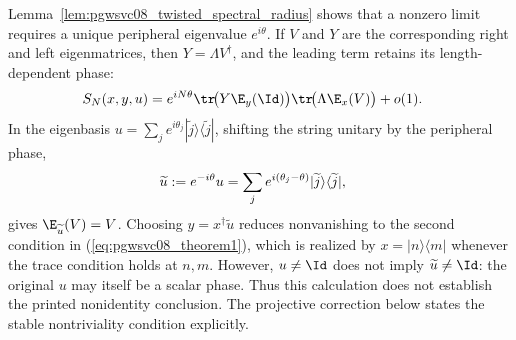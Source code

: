 \begin{remark}
    Lemma~\ref{lem:pgwsvc08_twisted_spectral_radius} shows that a nonzero
    limit requires a unique peripheral eigenvalue $e^{i\theta}$.  If $V$ and
    $Y$ are the corresponding right and left eigenmatrices, then
    $Y=\Lambda V^\dagger$, and the leading term retains its length-dependent
    phase:
    \begin{align}
        S_N(x,y,u)
         & =e^{iN\theta}
        \tr\!\bigl(Y\E_y(\Id)\bigr)
        \tr\!\bigl(\Lambda\E_x(V)\bigr)+o(1).
        \notag
    \end{align}
    In the eigenbasis $u=\sum_j e^{i\theta_j}|\widetilde
        j\rangle\langle\widetilde j|$, shifting the string unitary by the
    peripheral phase,
    \begin{align}
        \widetilde u
         & :=e^{-i\theta}u
        =\sum_j e^{i(\theta_j-\theta)}
        |\widetilde j\rangle\langle\widetilde j|,
        \notag
    \end{align}
    gives $\E_{\widetilde u}(V)=V$.  Choosing
    $y=x^\dagger\widetilde u$ reduces nonvanishing to the second condition
    in (\ref{eq:pgwsvc08_theorem1}), which is realized by
    $x=|n\rangle\langle m|$ whenever the trace condition holds at $n,m$.
    However, $u\ne\Id$ does not imply $\widetilde u\ne\Id$: the original $u$
    may itself be a scalar phase.
    Thus this calculation does not establish the printed nonidentity
    conclusion. The projective correction below states the stable
    nontriviality condition explicitly.
\end{remark}

